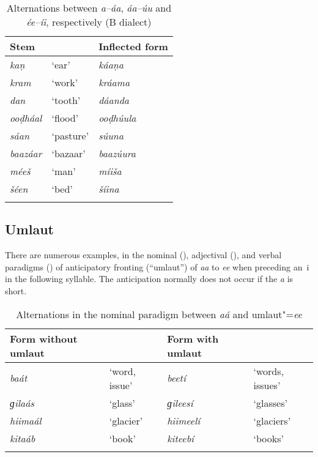 \begin{table}[ht]
\caption{Alternations between \textit{a--áa}, \textit{áa--úu} and \textit{ée--íi}, respectively (B dialect)}
\begin{tabularx}{\textwidth}{ Q Q Q }
\lsptoprule
Stem &
&
Inflected form\\\hline
\textit{kaṇ} &
`ear' &
\textit{káaṇa} \\
\textit{kram} &
`work' &
\textit{kráama} \\
\textit{dan} &
`tooth' &
\textit{dáanda} \\
\textit{ooḍháal} &
`flood' &
\textit{ooḍhúula} \\
\textit{sáan} &
`pasture' &
\textit{súuna} \\
\textit{baazáar} &
`bazaar' &
\textit{baazúura} \\
\textit{méeš} &
`man' &
\textit{míiša} \\
\textit{šéen} &
`bed' &
\textit{šíina} \\\lspbottomrule
\end{tabularx}
\label{tab:3-15}
\end{table}

\subsection{Umlaut}
\label{subsec:3-5-3}

There are numerous examples, in the nominal (), adjectival (), and verbal paradigms () of anticipatory fronting (``umlaut'') of \textit{aa} to \textit{ee} when preceding an~i in the following syllable. The anticipation normally does not occur if the \textit{a} is short. 


\begin{table}[ht]
\caption{Alternations in the nominal paradigm between \textit{aá} and umlaut"=\textit{ee} }
\begin{tabularx}{\textwidth}{ Q Q Q Q }
\lsptoprule
Form without umlaut &
&
Form with umlaut &
\\\hline
\textit{baát} &
`word, issue' &
\textit{beetí} &
`words, issues'\\
\textit{ɡilaás} &
`glass' &
\textit{ɡileesí} &
`glasses'\\
\textit{hiimaál} &
`glacier' &
\textit{hiimeelí} &
`glaciers'\\
\textit{kitaáb} &
`book' &
\textit{kiteebí} &
`books'\\\lspbottomrule
\end{tabularx}
\label{tab:3-16}
\end{table}



